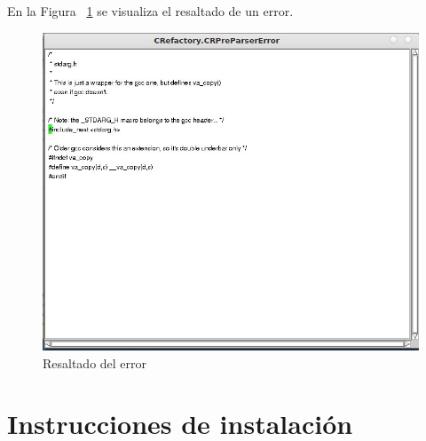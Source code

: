 \documentclass[a4paper,oneside,12pt]{article}
\begin{document}
En la Figura ~\ref{resaltado} se visualiza el resaltado de un error.
\begin{figure}[h!]
  \centering
    \includegraphics[scale=0.50]{images/codigo_modificado/highlight_preparser.jpg}
     \caption{Resaltado del error}
     \label{resaltado}
\end{figure}


\section{Instrucciones de instalaci\'on}
\end{document}

